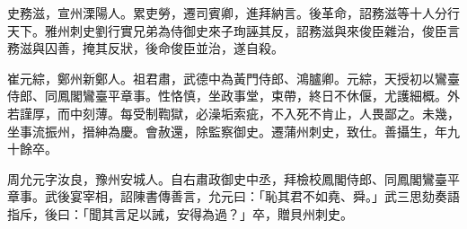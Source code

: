 \begin{pinyinscope}
 史務滋，宣州溧陽人。累吏勞，遷司賓卿，進拜納言。後革命，詔務滋等十人分行天下。雅州刺史劉行實兄弟為侍御史來子珣誣其反，詔務滋與來俊臣雜治，俊臣言務滋與囚善，掩其反狀，後命俊臣並治，遂自殺。



 崔元綜，鄭州新鄭人。祖君肅，武德中為黃門侍郎、鴻臚卿。元綜，天授初以鸞臺侍郎、同鳳閣鸞臺平章事。性恪慎，坐政事堂，束帶，終日不休偃，尤護細概。外若謹厚，而中刻薄。每受制鞫獄，必澡垢索疵，不入死不肯止，人畏鄙之。未幾，坐事流振州，搢紳為慶。會赦還，除監察御史。遷蒲州刺史，致仕。善攝生，年九十餘卒。



 周允元字汝良，豫州安城人。自右肅政御史中丞，拜檢校鳳閣侍郎、同鳳閣鸞臺平章事。武後宴宰相，詔陳書傳善言，允元曰：「恥其君不如堯、舜。」武三思劾奏語指斥，後曰：「聞其言足以誡，安得為過？」卒，贈貝州刺史。



\end{pinyinscope}